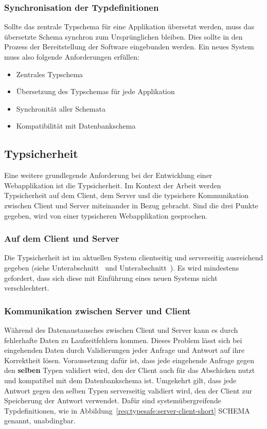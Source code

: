 \subsubsection{Synchronisation der Typdefinitionen}
Sollte das zentrale Typschema für eine Applikation übersetzt werden,
muss das übersetzte Schema synchron zum Ursprünglichen bleiben. Dies sollte in den Prozess der Bereitstellung der Software eingebunden werden.
Ein neues System muss also folgende Anforderungen erfüllen:

\begin{itemize}
    \setlength\itemsep{-1em}
    \item Zentrales Typschema
    \item Übersetzung des Typschemas für jede Applikation
    \item Synchronität aller Schemata
    \item Kompatibilität mit Datenbankschema
\end{itemize}

\subsection{Typsicherheit}
\label{req:typesafe}
Eine weitere grundlegende Anforderung bei der Entwicklung einer Webapplikation ist die Typsicherheit.
Im Kontext der Arbeit werden Typsicherheit auf dem Client,
dem Server und die typsichere Kommunikation zwischen Client und Server miteinander in Bezug gebracht.
Sind die drei Punkte gegeben, wird von einer typsicheren Webapplikation gesprochen.

\subsubsection{Auf dem Client und Server}
\label{req:typesafe:client}
Die Typsicherheit ist im aktuellen System clientseitig und serverseitig ausreichend gegeben (siehe Unterabschnitt~ und Unterabschnitt~).
Es wird mindestens gefordert, dass sich diese mit Einführung eines neuen Systems nicht verschlechtert.

\subsubsection{Kommunikation zwischen Server und Client}
\label{req:typesafe:api}
Während des Datenaustausches zwischen Client und Server kann es durch fehlerhafte Daten zu Laufzeitfehlern kommen.
Dieses Problem lässt sich bei eingehenden Daten durch Validierungen jeder Anfrage und Antwort auf ihre Korrektheit lösen.
Voraussetzung dafür ist, dass jede eingehende Anfrage gegen den \textbf{selben} Typen validiert wird,
den der Client auch für das Abschicken nutzt und kompatibel mit dem Datenbankschema ist.
Umgekehrt gilt, dass jede Antwort gegen den selben Typen serverseitig validiert wird, den der Client zur Speicherung der Antwort verwendet.
Dafür sind systemübergreifende Typdefinitionen, wie in Abbildung~\ref{req:typesafe:server-client-short} SCHEMA genannt, unabdingbar.

